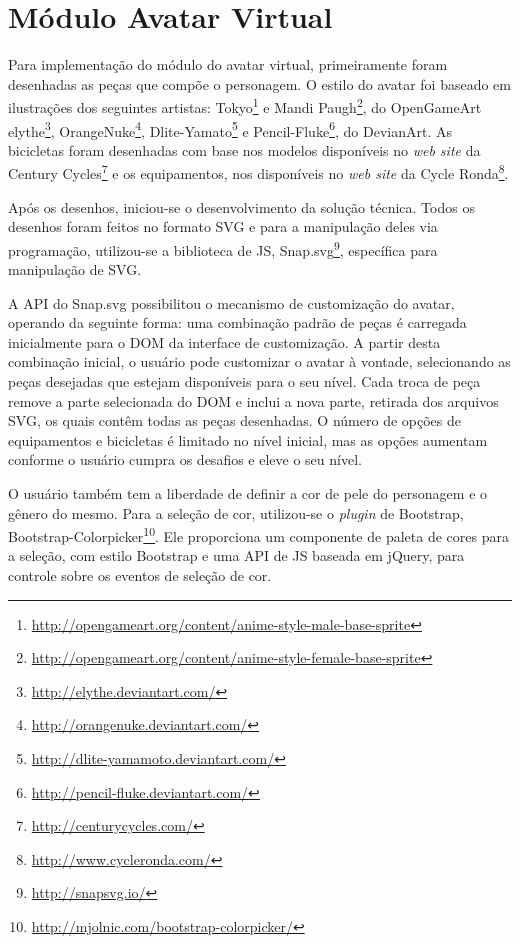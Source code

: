 \section{Módulo Avatar Virtual}
Para implementação do módulo do avatar virtual, primeiramente foram desenhadas as peças que compõe o personagem. O estilo do avatar foi baseado em ilustrações dos seguintes artistas: Tokyo\footnote{\url{http://opengameart.org/content/anime-style-male-base-sprite}} e Mandi Paugh\footnote{\url{http://opengameart.org/content/anime-style-female-base-sprite}}, do OpenGameArt elythe\footnote{\url{http://elythe.deviantart.com/}}, OrangeNuke\footnote{\url{http://orangenuke.deviantart.com/}}, Dlite-Yamato\footnote{\url{http://dlite-yamamoto.deviantart.com/}} e Pencil-Fluke\footnote{\url{http://pencil-fluke.deviantart.com/}}, do DevianArt. As bicicletas foram desenhadas com base nos modelos disponíveis no \textit{web site} da Century Cycles\footnote{\url{http://centurycycles.com/}} e os equipamentos, nos disponíveis no \textit{web site} da Cycle Ronda\footnote{\url{http://www.cycleronda.com/}}.
\par
Após os desenhos, iniciou-se o desenvolvimento da solução técnica. Todos os desenhos foram feitos no formato SVG e para a manipulação deles via programação, utilizou-se a biblioteca de JS, Snap.svg\footnote{\url{http://snapsvg.io/}}, específica para manipulação de SVG.
\par
A API do Snap.svg possibilitou o mecanismo de customização do avatar, operando da seguinte forma: uma combinação padrão de peças é carregada inicialmente para o DOM da interface de customização. A partir desta combinação inicial, o usuário pode customizar o avatar à vontade, selecionando as peças desejadas que estejam disponíveis para o seu nível. Cada troca de peça remove a parte selecionada do DOM e inclui a nova parte, retirada dos arquivos SVG, os quais contêm todas as peças desenhadas. O número de opções de equipamentos e bicicletas é limitado no nível inicial, mas as opções aumentam conforme o usuário cumpra os desafios e eleve o seu nível.
\par
O usuário também tem a liberdade de definir a cor de pele do personagem e o gênero do mesmo. Para a seleção de cor, utilizou-se o \textit{plugin} de Bootstrap, Bootstrap-Colorpicker\footnote{\url{http://mjolnic.com/bootstrap-colorpicker/}}. Ele proporciona um componente de paleta de cores para a seleção, com estilo Bootstrap e uma API de JS baseada em jQuery, para controle sobre os eventos de seleção de cor.
\par
